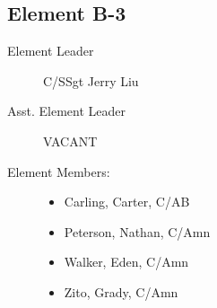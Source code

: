 \documentclass[12pt]{article}
\begin{document}
\begin{multicols}{3}
    \columnbreak

    \subsection*{Element B-3}
    \begin{description}
        \item[Element Leader] C/SSgt Jerry Liu
        \item[Asst. Element Leader] VACANT
        \item[Element Members:]\hfill
        \begin{itemize}
            \item Carling, Carter, C/AB
            \item Peterson, Nathan, C/Amn
            \item Walker, Eden, C/Amn
            \item Zito, Grady, C/Amn
        \end{itemize}
    \end{description}
\end{multicols}
\end{document}
